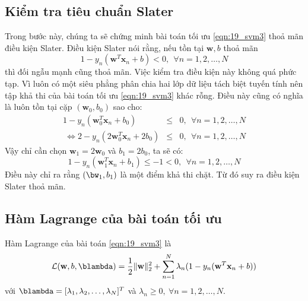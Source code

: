 \subsection{Kiểm tra tiêu chuẩn Slater} 
Trong bước này, chúng ta sẽ chứng minh
bài toán tối ưu \eqref{eqn:19_svm3} thoả mãn điều kiện Slater. Điều kiện Slater
nói rằng, nếu tồn tại $\mathbf{w}, b$ thoả mãn  \begin{equation*}  1 -
y_n(\mathbf{w}^T\mathbf{x}_n + b) < 0, ~~\forall n = 1, 2, \dots, N
\end{equation*}  thì đối ngẫu mạnh cũng thoả mãn.
Việc kiểm tra điều kiện này không quá phức tạp. Vì luôn có một siêu 
phẳng phân chia hai lớp dữ liệu tách biệt tuyến tính nên tập khả thi của bài toán tối ưu
\eqref{eqn:19_svm3} khác rỗng. Điều này cũng có nghĩa là luôn tồn tại cặp $(\mathbf{w}_0,
b_0)$ sao cho:
\begin{eqnarray}  1 - y_n(\mathbf{w}_0^T\mathbf{x}_n + b_0)
&\leq& 0, ~~\forall n = 1, 2, \dots, N \\\  \Leftrightarrow 2 -
y_n(2\mathbf{w}_0^T\mathbf{x}_n + 2b_0) &\leq& 0, ~~\forall n = 1, 2, \dots, N
\end{eqnarray}
Vậy chỉ cần chọn $\mathbf{w}_1 = 2\mathbf{w}_0$ và $b_1 = 2b_0$, ta sẽ có:  
\begin{equation*} 
1 - y_n(\mathbf{w}_1^T\mathbf{x}_n + b_1) \leq -1 < 0, ~~\forall n = 1, 2, \dots, N 
\end{equation*} 
Điều này chỉ ra rằng $(\bw_1, b_1)$ là một điểm khả thi chặt. Từ đó suy ra điều kiện Slater thoả mãn.  
 
 
\subsection{Hàm Lagrange của bài toán tối ưu}
Hàm Lagrange của bài toán \eqref{eqn:19_svm3} là
\begin{equation} 
\label{eqn:19_svm4}
\mathcal{L}(\mathbf{w}, b, \blambda) = \frac{1}{2} \|\mathbf{w}\|_2^2 +
\sum_{n=1}^N \lambda_n(1 - y_n(\mathbf{w}^T\mathbf{x}_n + b) )
\end{equation} 
với $\blambda = [\lambda_1, \lambda_2, \dots, \lambda_N]^T$ và $\lambda_n \geq
0, ~\forall n = 1, 2, \dots, N$. 
 
